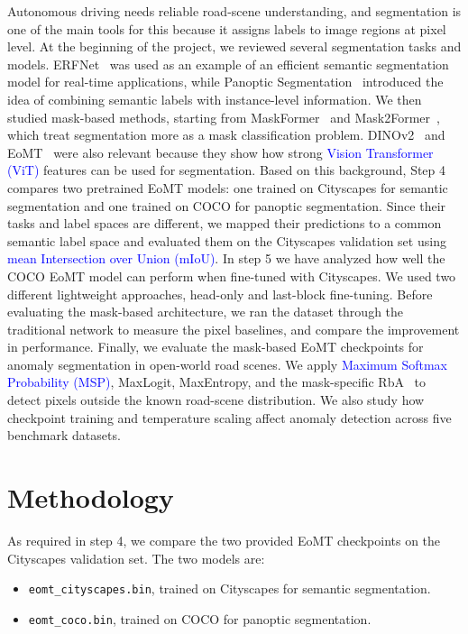\documentclass[10pt,twocolumn,letterpaper]{article}
\begin{document}
Autonomous driving needs reliable road-scene understanding, and segmentation is one of the main tools for this because it assigns labels to image regions at pixel level. At the beginning of the project, we reviewed several segmentation tasks and models. ERFNet~\cite{romera2017erfnet} was used as an example of an efficient semantic segmentation model for real-time applications, while Panoptic Segmentation~\cite{kirillov2019panoptic} introduced the idea of combining semantic labels with instance-level information. We then studied mask-based methods, starting from MaskFormer~\cite{cheng2021per} and Mask2Former~\cite{cheng2022masked}, which treat segmentation more as a mask classification problem. \mbox{DINOv2}~\cite{oquab2023dinov2} and EoMT~\cite{kerssies2025your} were also relevant because they show how strong \textcolor{blue}{Vision Transformer (ViT)} features can be used for segmentation. Based on this background, Step 4 compares two pretrained EoMT models: one trained on Cityscapes for semantic segmentation and one trained on COCO for panoptic segmentation. Since their tasks and label spaces are different, we mapped their predictions to a common semantic label space and evaluated them on the Cityscapes validation set using \textcolor{blue}{mean Intersection over Union (mIoU)}. In step 5 we have analyzed how well the COCO EoMT model can perform when fine-tuned with Cityscapes. We used two different lightweight approaches, head-only and last-block fine-tuning.
Before evaluating the mask-based architecture, we ran the dataset through the traditional network to measure the pixel baselines, and compare the improvement in performance.
Finally, we evaluate the mask-based EoMT checkpoints for anomaly segmentation in open-world road scenes. We apply \textcolor{blue}{Maximum Softmax Probability (MSP)}, MaxLogit, MaxEntropy, and the mask-specific RbA~\cite{nayal2023rba} to detect pixels outside the known road-scene distribution. We also study how checkpoint training and temperature scaling affect anomaly detection across five benchmark datasets.


\section{Methodology}


As required in step 4, we compare the two provided EoMT checkpoints on the Cityscapes validation set. The two models are:

\begin{itemize}
    \item \texttt{eomt\_cityscapes.bin}, trained on Cityscapes for semantic segmentation.
    \item \texttt{eomt\_coco.bin}, trained on COCO for panoptic segmentation.
\end{itemize}
\end{document}
